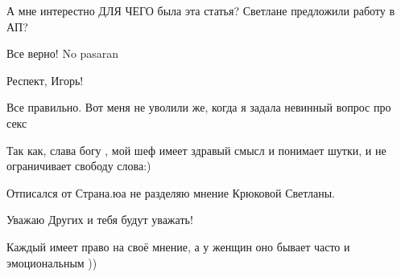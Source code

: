 \begin{itemize}
А мне интерестно ДЛЯ ЧЕГО была эта статья? Светлане предложили работу в АП?

 
Все верно! No pasaran

 
Респект, Игорь!

 

Все правильно. Вот меня не уволили же, когда я задала невинный вопрос про
секс🙈😂

Так как, слава богу , мой шеф имеет здравый смысл и понимает шутки, и не
ограничивает свободу слова:)


 

Отписался от Страна.юа не разделяю мнение Крюковой Светланы.

 

Уважаю Других и тебя будут уважать!

Каждый имеет право на своё мнение, а у женщин оно бывает часто и эмоциональным ))


 


\end{itemize}
